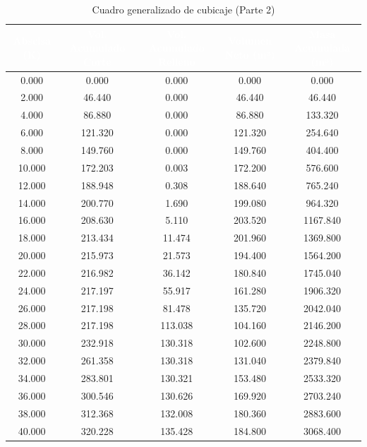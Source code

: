 \documentclass[11pt,letterpaper]{article}
\begin{document}
\begin{table}[H]
  \centering
  \small
  \caption{Cuadro generalizado de cubicaje (Parte 2)}
  \label{tab:cubicaje_1}
  \begin{tabular}{|c|c|c|c|c|}
    \hline
    \rowcolor{GeoBlue}
    \textcolor{white}{\textbf{Abscisa (K)}} & \textcolor{white}{\textbf{Vol. Acumulado Corte}} & \textcolor{white}{\textbf{Vol. Acumulado Relleno}} & \textcolor{white}{\textbf{Volumen Neto (m³)}} & \textcolor{white}{\textbf{Masa Acumulada (m³)}} \\
    \hline
    \rowcolor{GeoBlue!5}
    0.000 & 0.000 & 0.000 & 0.000 & 0.000 \\
    \hline
    \rowcolor{white}
    2.000 & 46.440 & 0.000 & 46.440 & 46.440 \\
    \hline
    \rowcolor{GeoBlue!5}
    4.000 & 86.880 & 0.000 & 86.880 & 133.320 \\
    \hline
    \rowcolor{white}
    6.000 & 121.320 & 0.000 & 121.320 & 254.640 \\
    \hline
    \rowcolor{GeoBlue!5}
    8.000 & 149.760 & 0.000 & 149.760 & 404.400 \\
    \hline
    \rowcolor{white}
    10.000 & 172.203 & 0.003 & 172.200 & 576.600 \\
    \hline
    \rowcolor{GeoBlue!5}
    12.000 & 188.948 & 0.308 & 188.640 & 765.240 \\
    \hline
    \rowcolor{white}
    14.000 & 200.770 & 1.690 & 199.080 & 964.320 \\
    \hline
    \rowcolor{GeoBlue!5}
    16.000 & 208.630 & 5.110 & 203.520 & 1167.840 \\
    \hline
    \rowcolor{white}
    18.000 & 213.434 & 11.474 & 201.960 & 1369.800 \\
    \hline
    \rowcolor{GeoBlue!5}
    20.000 & 215.973 & 21.573 & 194.400 & 1564.200 \\
    \hline
    \rowcolor{white}
    22.000 & 216.982 & 36.142 & 180.840 & 1745.040 \\
    \hline
    \rowcolor{GeoBlue!5}
    24.000 & 217.197 & 55.917 & 161.280 & 1906.320 \\
    \hline
    \rowcolor{white}
    26.000 & 217.198 & 81.478 & 135.720 & 2042.040 \\
    \hline
    \rowcolor{GeoBlue!5}
    28.000 & 217.198 & 113.038 & 104.160 & 2146.200 \\
    \hline
    \rowcolor{white}
    30.000 & 232.918 & 130.318 & 102.600 & 2248.800 \\
    \hline
    \rowcolor{GeoBlue!5}
    32.000 & 261.358 & 130.318 & 131.040 & 2379.840 \\
    \hline
    \rowcolor{white}
    34.000 & 283.801 & 130.321 & 153.480 & 2533.320 \\
    \hline
    \rowcolor{GeoBlue!5}
    36.000 & 300.546 & 130.626 & 169.920 & 2703.240 \\
    \hline
    \rowcolor{white}
    38.000 & 312.368 & 132.008 & 180.360 & 2883.600 \\
    \hline
    \rowcolor{GeoBlue!5}
    40.000 & 320.228 & 135.428 & 184.800 & 3068.400 \\
    \hline
  \end{tabular}
\end{table}
\end{document}

